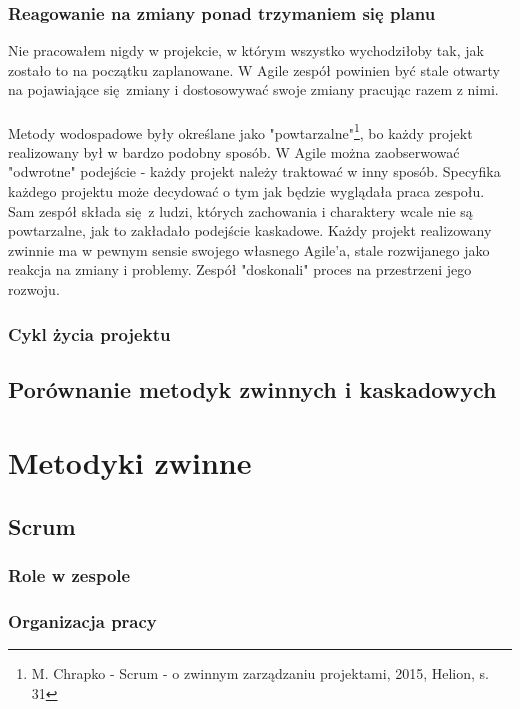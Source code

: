 \documentclass{article}
\begin{document}
\subsubsection*{Reagowanie na zmiany ponad trzymaniem się planu}
Nie pracowałem nigdy w projekcie, w którym wszystko wychodziłoby tak, jak zostało to na początku zaplanowane. W Agile zespół powinien być stale otwarty na pojawiające się zmiany i dostosowywać swoje zmiany pracując razem z nimi.

\paragraph{}
Metody wodospadowe były określane jako "powtarzalne"\footnote{M. Chrapko - Scrum - o zwinnym zarządzaniu projektami, 2015, Helion, s. 31}, bo każdy projekt realizowany był w bardzo podobny sposób. W Agile można zaobserwować "odwrotne" podejście - każdy projekt należy traktować w inny sposób. Specyfika każdego projektu może decydować o tym jak będzie wyglądała praca zespołu. Sam zespół składa się z ludzi, których zachowania i charaktery wcale nie są powtarzalne, jak to zakładało podejście kaskadowe. Każdy projekt realizowany zwinnie ma w pewnym sensie swojego własnego Agile'a, stale rozwijanego jako reakcja na zmiany i problemy. Zespół "doskonali" proces na przestrzeni jego rozwoju.

\subsubsection{Cykl życia projektu}
\subsection{Porównanie metodyk zwinnych i kaskadowych}

\section{Metodyki zwinne}

\subsection{Scrum}
\subsubsection{Role w zespole}
\subsubsection{Organizacja pracy}
\end{document}
